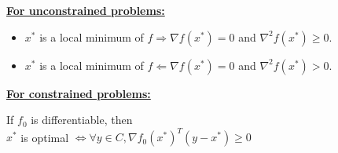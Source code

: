 \underline{\textbf{For unconstrained problems:}
}
\begin{itemize}
    \item $x^{*}$ is a local minimum of $f \Rightarrow \nabla f\left(x^{*}\right)=0$ and $\nabla^{2} f\left(x^{*}\right) \geq 0$.
    \item $x^{*}$ is a local minimum of $f \Leftarrow \nabla f\left(x^{*}\right)=0$ and $\nabla^{2} f\left(x^{*}\right) > 0$.
\end{itemize}


\underline{\textbf{For constrained problems:}
}

If $f_0$ is differentiable, then \\
  $x^*$ is optimal $\Leftrightarrow \forall y \in C, \nabla f_{0}(x^*)^{T}(y-x^*) \geq 0$ \\







